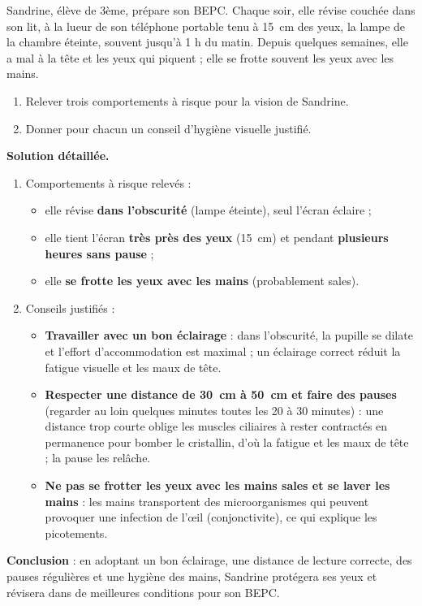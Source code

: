 \documentclass[11pt]{article}
\begin{document}
\begin{exoresolu}
Sandrine, élève de 3ème, prépare son BEPC. Chaque soir, elle révise couchée dans son lit, à la lueur de son téléphone portable tenu à \SI{15}{cm} des yeux, la lampe de la chambre éteinte, souvent jusqu'à 1 h du matin. Depuis quelques semaines, elle a mal à la tête et les yeux qui piquent ; elle se frotte souvent les yeux avec les mains.
\begin{enumerate}
\item Relever trois comportements à risque pour la vision de Sandrine.
\item Donner pour chacun un conseil d'hygiène visuelle justifié.
\end{enumerate}
\tcblower
\textbf{Solution détaillée.}
\begin{enumerate}
\item Comportements à risque relevés :
\begin{itemize}
\item elle révise \textbf{dans l'obscurité} (lampe éteinte), seul l'écran éclaire ;
\item elle tient l'écran \textbf{très près des yeux} (\SI{15}{cm}) et pendant \textbf{plusieurs heures sans pause} ;
\item elle \textbf{se frotte les yeux avec les mains} (probablement sales).
\end{itemize}
\item Conseils justifiés :
\begin{itemize}
\item \textbf{Travailler avec un bon éclairage} : dans l'obscurité, la pupille se dilate et l'effort d'accommodation est maximal ; un éclairage correct réduit la fatigue visuelle et les maux de tête.
\item \textbf{Respecter une distance de \SI{30}{cm} à \SI{50}{cm} et faire des pauses} (regarder au loin quelques minutes toutes les 20 à 30 minutes) : une distance trop courte oblige les muscles ciliaires à rester contractés en permanence pour bomber le cristallin, d'où la fatigue et les maux de tête ; la pause les relâche.
\item \textbf{Ne pas se frotter les yeux avec les mains sales et se laver les mains} : les mains transportent des microorganismes qui peuvent provoquer une infection de l'œil (conjonctivite), ce qui explique les picotements.
\end{itemize}
\end{enumerate}
\textbf{Conclusion} : en adoptant un bon éclairage, une distance de lecture correcte, des pauses régulières et une hygiène des mains, Sandrine protégera ses yeux et révisera dans de meilleures conditions pour son BEPC.
\end{exoresolu}
\end{document}
